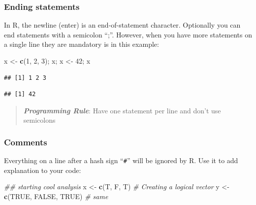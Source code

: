 \documentclass[]{book}
\newenvironment{Shaded}{\begin{snugshade}}{\end{snugshade}}
\newcommand{\CommentTok}[1]{\textcolor[rgb]{0.56,0.35,0.01}{\textit{#1}}}
\newcommand{\DecValTok}[1]{\textcolor[rgb]{0.00,0.00,0.81}{#1}}
\newcommand{\KeywordTok}[1]{\textcolor[rgb]{0.13,0.29,0.53}{\textbf{#1}}}
\newcommand{\NormalTok}[1]{#1}
\newcommand{\OtherTok}[1]{\textcolor[rgb]{0.56,0.35,0.01}{#1}}
\newcommand{\StringTok}[1]{\textcolor[rgb]{0.31,0.60,0.02}{#1}}
\begin{document}
\hypertarget{ending-statements}{%
\subsubsection*{Ending statements}\label{ending-statements}}

In R, the newline (enter) is an end-of-statement character. Optionally you can end statements with a semicolon ``;''. However, when you have more statements on a single line they are mandatory is in this example:

\begin{Shaded}
\begin{Highlighting}[]
\NormalTok{x <-}\StringTok{ }\KeywordTok{c}\NormalTok{(}\DecValTok{1}\NormalTok{, }\DecValTok{2}\NormalTok{, }\DecValTok{3}\NormalTok{); x; x <-}\StringTok{ }\DecValTok{42}\NormalTok{; x}
\end{Highlighting}
\end{Shaded}

\begin{verbatim}
## [1] 1 2 3
\end{verbatim}

\begin{verbatim}
## [1] 42
\end{verbatim}

\begin{quote}
\textbf{\emph{Programming Rule}}: Have one statement per line and don't use semicolons
\end{quote}

\hypertarget{comments}{%
\subsubsection*{Comments}\label{comments}}

Everything on a line after a hash sign ``\texttt{\#}'' will be ignored by R. Use it to add explanation to your code:

\begin{Shaded}
\begin{Highlighting}[]
\CommentTok{## starting cool analysis}
\NormalTok{x <-}\StringTok{ }\KeywordTok{c}\NormalTok{(T, F, T) }\CommentTok{# Creating a logical vector}
\NormalTok{y <-}\StringTok{ }\KeywordTok{c}\NormalTok{(}\OtherTok{TRUE}\NormalTok{, }\OtherTok{FALSE}\NormalTok{, }\OtherTok{TRUE}\NormalTok{) }\CommentTok{# same}
\end{Highlighting}
\end{Shaded}
\end{document}
